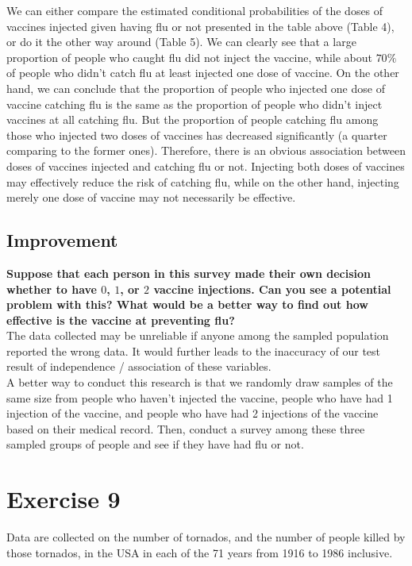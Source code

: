 \documentclass[
]{book}
\begin{document}
We can either compare the estimated conditional probabilities of the doses of vaccines injected given having flu or not presented in the table above (Table 4), or do it the other way around (Table 5). We can clearly see that a large proportion of people who caught flu did not inject the vaccine, while about \(70\%\) of people who didn't catch flu at least injected one dose of vaccine. On the other hand, we can conclude that the proportion of people who injected one dose of vaccine catching flu is the same as the proportion of people who didn't inject vaccines at all catching flu. But the proportion of people catching flu among those who injected two doses of vaccines has decreased significantly (a quarter comparing to the former ones). Therefore, there is an obvious association between doses of vaccines injected and catching flu or not. Injecting both doses of vaccines may effectively reduce the risk of catching flu, while on the other hand, injecting merely one dose of vaccine may not necessarily be effective.

\section{Improvement}\label{improvement}

\textbf{Suppose that each person in this survey made their own decision whether to have \(0\), \(1\), or \(2\) vaccine injections. Can you see a potential problem with this? What would be a better way to find out how effective is the vaccine at preventing flu?}\\
The data collected may be unreliable if anyone among the sampled population reported the wrong data. It would further leads to the inaccuracy of our test result of independence / association of these variables.\\
A better way to conduct this research is that we randomly draw samples of the same size from people who haven't injected the vaccine, people who have had 1 injection of the vaccine, and people who have had 2 injections of the vaccine based on their medical record. Then, conduct a survey among these three sampled groups of people and see if they have had flu or not.

\chapter{Exercise 9}\label{exercise-9}

Data are collected on the number of tornados, and the number of people killed by those tornados, in the USA in each of the 71 years from 1916 to 1986 inclusive.
\end{document}
